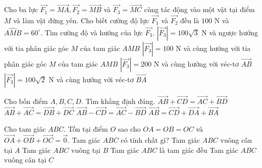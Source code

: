 \begin{ex}%
	Cho ba lực $\vec{F_1}=\vec{MA}, \vec{F_2}=\vec{MB}$ và $\vec{F_3}=\vec{MC}$ cùng tác động vào một vật tại điểm $M$ và làm vật đứng yên. Cho biết cường độ lực $\vec{F_1}$ và $\vec{F_2}$ đều là $100$ N và $\widehat{AMB}=60^\circ$. Tìm cường độ và hướng của lực $\vec{F_3}$.
	\choice
	{\True $|\vec{F_3}|=100 \sqrt{3}$ N và ngược hướng với tia phân giác  góc $M$ của tam giác $AMB$ }
	{$|\vec{F_3}|=100$ N và cùng hướng với tia phân giác góc $M$ của tam giác $AMB$ }
	{$|\vec{F_3}|=200$ N và cùng hướng với véc-tơ $\vec{AB}$ }
	{$|\vec{F_3}|=100\sqrt{2}$ N và cùng hướng với véc-tơ $\vec{BA}$ }
\end{ex}


\begin{ex}%
	Cho bốn điểm $A, B, C, D$. Tìm khẳng định đúng.
	\choice
	{$\vec{AB}+\vec{CD}=\vec{AC}+\vec{BD}$}
	{$\vec{AB}+\vec{AC}=\vec{DB}+\vec{DC}$}
	{\True $\vec{AB}-\vec{CD}=\vec{AC}-\vec{BD}$}
	{$\vec{AB}=\vec{CD}+\vec{DA}+\vec{BA}$}
\end{ex}





\begin{ex}%
	Cho tam giác $ABC$. Tồn tại điểm $O$ sao cho $OA=OB=OC$ và $\vec{OA}+\vec{OB}+\vec{OC}=\vec{0}$. Tam giác $ABC$ có tính chất gì?
	\choice
	{Tam giác $ABC$ vuông cân tại $A$}
	{Tam giác $ABC$ vuông tại $B$}
	{\True Tam giác $ABC$ là tam giác đều}
	{Tam giác $ABC$ vuông cân tại $C$}
\end{ex}


